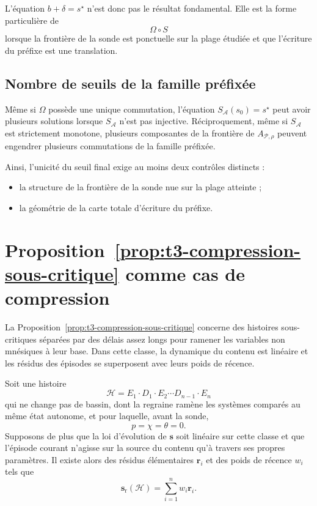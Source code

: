 L'équation $b+\delta=s^{\star}$ n'est donc pas le résultat fondamental.
Elle est la forme particulière de
\[
\Omega\circ S
\]
lorsque la frontière de la sonde est ponctuelle sur la plage étudiée et
que l'écriture du préfixe est une translation.

\subsection{Nombre de seuils de la famille préfixée}
\label{annexe-H-nombre-seuils}

Même si $\Omega$ possède une unique commutation, l'équation
$S_{\mathcal A}(s_0)=s^{\star}$ peut avoir plusieurs solutions lorsque
$S_{\mathcal A}$ n'est pas injective. Réciproquement, même si
$S_{\mathcal A}$ est strictement monotone, plusieurs composantes de la
frontière de $A_{\mathcal P,\rho}$ peuvent engendrer plusieurs
commutations de la famille préfixée.

Ainsi, l'unicité du seuil final exige au moins deux contrôles distincts :
\begin{itemize}
\item la structure de la frontière de la sonde nue sur la plage atteinte ;
\item la géométrie de la carte totale d'écriture du préfixe.
\end{itemize}

\section{Proposition~\ref{prop:t3-compression-sous-critique} comme cas de compression}
\label{annexe-H-compression-sous-critique}

La Proposition~\ref{prop:t3-compression-sous-critique} concerne des histoires sous-critiques séparées par
des délais assez longs pour ramener les variables non mnésiques à leur
base. Dans cette classe, la dynamique du contenu est linéaire et les
résidus des épisodes se superposent avec leurs poids de récence.

Soit une histoire
\[
\mathcal H
=
E_1\cdot D_1\cdot E_2\cdots D_{n-1}\cdot E_n
\]
qui ne change pas de bassin, dont la regraine ramène les systèmes
comparés au même état autonome, et pour laquelle, avant la sonde,
\[
p=\chi=\theta=0.
\]
Supposons de plus que la loi d'évolution de $\mathbf s$ soit linéaire
sur cette classe et que l'épisode courant n'agisse sur la source du
contenu qu'à travers ses propres paramètres. Il existe alors des
résidus élémentaires $\mathbf r_i$ et des poids de récence $w_i$ tels
que
\begin{equation}
\label{eq:annexe-H-superposition}
\mathbf s_{\mathrm r}(\mathcal H)
=
\sum_{i=1}^{n}w_i\mathbf r_i.
\end{equation}

